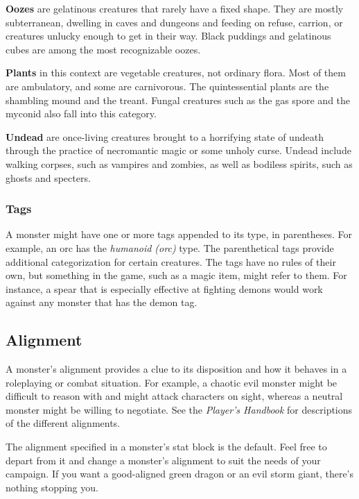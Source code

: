 \documentclass[
]{article}
\begin{document}
\textbf{Oozes} are gelatinous creatures that rarely have a fixed shape.
They are mostly subterranean, dwelling in caves and dungeons and feeding
on refuse, carrion, or creatures unlucky enough to get in their way.
Black puddings and gelatinous cubes are among the most recognizable
oozes.

\textbf{Plants} in this context are vegetable creatures, not ordinary
flora. Most of them are ambulatory, and some are carnivorous. The
quintessential plants are the shambling mound and the treant. Fungal
creatures such as the gas spore and the myconid also fall into this
category.

\textbf{Undead} are once-living creatures brought to a horrifying state
of undeath through the practice of necromantic magic or some unholy
curse. Undead include walking corpses, such as vampires and zombies, as
well as bodiless spirits, such as ghosts and specters.

\hypertarget{tags}{%
\subsubsection{Tags}\label{tags}}

A monster might have one or more tags appended to its type, in
parentheses. For example, an orc has the \emph{humanoid (orc)} type. The
parenthetical tags provide additional categorization for certain
creatures. The tags have no rules of their own, but something in the
game, such as a magic item, might refer to them. For instance, a spear
that is especially effective at fighting demons would work against any
monster that has the demon tag.

\hypertarget{alignment}{%
\subsection{Alignment}\label{alignment}}

A monster's alignment provides a clue to its disposition and how it
behaves in a roleplaying or combat situation. For example, a chaotic
evil monster might be difficult to reason with and might attack
characters on sight, whereas a neutral monster might be willing to
negotiate. See the \emph{Player's Handbook} for descriptions of the
different alignments.

The alignment specified in a monster's stat block is the default. Feel
free to depart from it and change a monster's alignment to suit the
needs of your campaign. If you want a good-aligned green dragon or an
evil storm giant, there's nothing stopping you.
\end{document}
